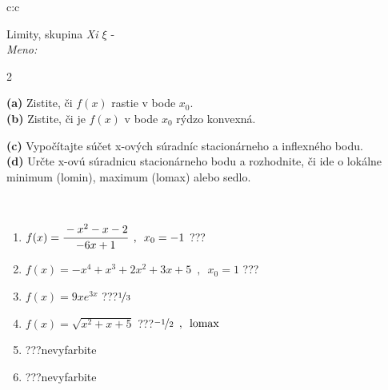 \documentclass[10pt]{report}
\begin{document}
\begin{tabular}{c:c}
\begin{minipage}[c][104.5mm][t]{0.5\linewidth}
\begin{center}
\vspace{7mm}
{\huge Limity, skupina \textit{Xi $\xi$} -}\\[5mm]
\textit{Meno:}\phantom{xxxxxxxxxxxxxxxxxxxxxxxxxxxxxxxxxxxxxxxxxxxxxxxxxxxxxxxxxxxxxxxxx}\\[5mm]
\begin{minipage}{0.95\linewidth}
\begin{center}
{\small \begin{multicols}{2} \raggedright
\textbf{(a)} Zistite, či \(f(x)\) rastie v bode \(x_0\). \\[1mm]
\textbf{(b)} Zistite, či je \(f(x)\) v bode \(x_0\) rýdzo konvexná. \par \columnbreak
\textbf{(c)} Vypočítajte súčet x-ových súradníc stacionárneho a inflexného bodu. \\[1mm]
\textbf{(d)} Určte x-ovú súradnicu stacionárneho bodu a rozhodnite, či ide o lokálne minimum (lomin), maximum (lomax) alebo sedlo. \\[1mm]
\end{multicols}
}
\end{center}
\end{minipage}
\\[4mm]
\begin{minipage}{0.79\linewidth}
\begin{center}
\begin{varwidth}{\linewidth}
\begin{enumerate}
\normalsize
\item $f(x)=\cfrac{-x^2-x-2}{-6x+1}\enspace , \enspace x_0=-1$\quad \dotfill\; ???\;\dotfill \quad {}
\item $f(x)=-x^4+x^3+2x^2+3x+5\enspace , \enspace x_0=1$\quad \dotfill\; ???\;\dotfill \quad {}
\item $f(x)=9xe^{3x}$\quad \dotfill\; ???\;\dotfill \quad $\nicefrac{1}{3}$
\item $f(x)=\sqrt{x^2+x+5}$\quad \dotfill\; ???\;\dotfill \quad $\nicefrac{-1}{2}\enspace , \enspace\text{lomax}$
\item \quad \dotfill\; ???\;\dotfill \quad nevyfarbite
\item \quad \dotfill\; ???\;\dotfill \quad nevyfarbite
\end{enumerate}
\end{varwidth}
\end{center}

\end{minipage}
\end{center}
\end{minipage}
\end{tabular}
\end{document}
